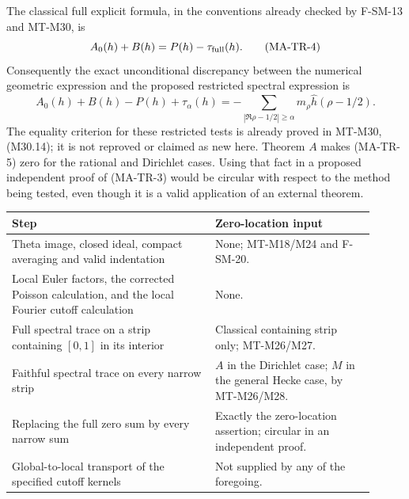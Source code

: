 The classical full explicit formula, in the conventions already
checked by F-SM-13 and MT-M30, is
\[
 A_0(h)+B(h)=P(h)-\tau_{\rm full}(h).
 \tag{MA-TR-4}
\]
Consequently the exact unconditional discrepancy between the numerical
geometric expression and the proposed restricted spectral expression is
\[
 A_0(h)+B(h)-P(h)+\tau_\alpha(h)
   =-\!\sum_{|\Re\rho-1/2|\ge\alpha}
                    m_\rho\widehat h(\rho-1/2).
 \tag{MA-TR-5}
\]
The equality criterion for these restricted tests is already proved in
MT-M30, (M30.14); it is not reproved or claimed as new here. Theorem
$A$ makes (MA-TR-5) zero for the rational and Dirichlet cases. Using
that fact in a proposed independent proof of (MA-TR-3) would be
circular with respect to the method being tested, even though it is a
valid application of an external theorem.

\begin{center}
\begin{tabular}{p{0.51\linewidth}p{0.40\linewidth}}
\hline
Step & Zero-location input \\
\hline
Theta image, closed ideal, compact averaging and valid indentation &
None; MT-M18/M24 and F-SM-20.\\
Local Euler factors, the corrected Poisson calculation, and the local
Fourier cutoff calculation & None.\\
Full spectral trace on a strip containing $[0,1]$ in its interior &
Classical containing strip only; MT-M26/M27.\\
Faithful spectral trace on every narrow strip & $A$ in the Dirichlet
case; $M$ in the general Hecke case, by MT-M26/M28.\\
Replacing the full zero sum by every narrow sum & Exactly the
zero-location assertion; circular in an independent proof.\\
Global-to-local transport of the specified cutoff kernels &
Not supplied by any of the foregoing.\\
\hline
\end{tabular}
\end{center}

